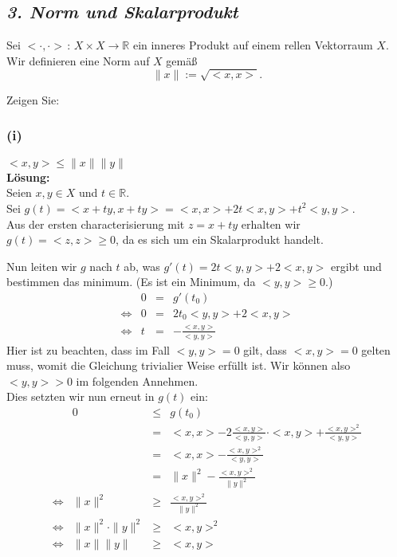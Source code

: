 \subsection*{\itshape 3. Norm und Skalarprodukt}

Sei $<\cdot,\cdot> \, : \, X \times X \rightarrow \mathbb{R}$ ein inneres Produkt auf einem rellen Vektorraum $X$. Wir
definieren eine Norm auf $X$ gemäß
$$
    \| x \| := \sqrt{<x,x>}.
$$

Zeigen Sie:

\subsubsection*{(i)}
$<x,y> \leq \| x \| \| y \|$\\
\textbf{Lösung:}\\

Seien $x, y \in X$ und $t \in \mathbb{R}$.\\

Sei $g(t) = <x + ty, x + ty> = <x,x> + 2t <x,y> + t^2 <y,y>$.\\
Aus der ersten characterisierung mit $z = x + ty$ erhalten wir
$g(t) = <z,z> \geq 0$, da es sich um ein Skalarprodukt handelt.

Nun leiten wir $g$ nach $t$ ab, was
$g'(t) = 2t <y,y> + 2 <x,y>$ ergibt und bestimmen das minimum.
(Es ist ein Minimum, da $<y,y> \geq 0$.)\\
$$\begin{array}{lrcl}
    & 0 &=& g'(t_0)\\
\Leftrightarrow & 0 &=& 2t_0 <y,y> + 2 <x,y>\\
\Leftrightarrow & t &=& - \frac{<x,y>}{<y,y>}
\end{array}$$
Hier ist zu beachten, dass im Fall $<y,y> = 0$ gilt, dass $<x,y> = 0$ gelten muss, womit die
Gleichung trivialier Weise erfüllt ist. Wir können also $<y,y> > 0$ im folgenden Annehmen.\\

Dies setzten wir nun erneut in $g(t)$ ein:
$$\begin{array}{lrcl}
&   0       &\leq& g(t_0)\\
&           &=& <x,x> - 2 \frac{<x,y>}{<y,y>}\cdot <x,y> + \frac{<x,y>^2}{<y,y>}\\
&           &=& <x,x> - \frac{<x,y>^2}{<y,y>}\\
&           &=& \| x \|^2 - \frac{<x,y>^2}{\| y \|^2}\\
\Leftrightarrow& \| x \|^2 & \geq & \frac{<x,y>^2}{\| y \|^2}\\
\Leftrightarrow& \| x \|^2 \cdot \| y \|^2 &\geq& <x,y>^2\\
\Leftrightarrow& \| x \| \| y \| & \geq & <x,y>
\end{array}$$

